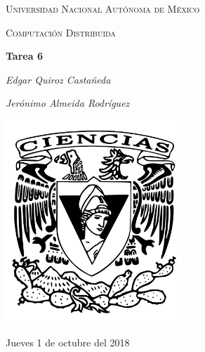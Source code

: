 \documentclass[12pt,a4paper]{report}
\begin{document}
	\newcommand{\upon}[1]{\textbf{Upon} #1 \textbf{do}}

	\begin{titlepage}
		\centering
		{\scshape\LARGE Universidad Nacional Autónoma de México \par}
		\vspace{1cm}
		{\scshape\Large Computación Distribuida\par}
		\vspace{1.5cm}
		{\huge\bfseries Tarea 6\par}
		\vspace{.5cm}
		{\Large\itshape Edgar Quiroz Castañeda \par}
	    \vspace{.5cm}
		{\Large\itshape Jerónimo Almeida Rodríguez \par}
		\vfill
		 \includegraphics[width=0.5\textwidth]{escudo_f-ciencias.png}
		\vfill

		{\large Jueves 1 de octubre del 2018 \par}
	\end{titlepage}

	\pagebreak
	\setlength{\voffset}{-0.75in}
	\setlength{\headsep}{5pt}
\end{document}
